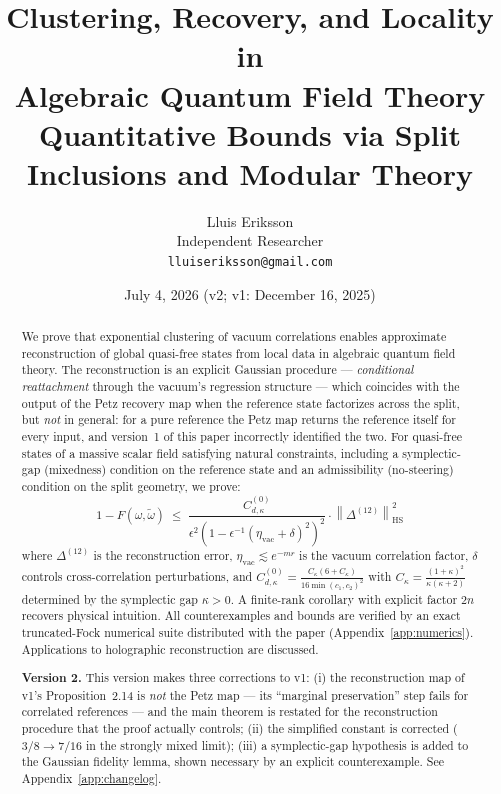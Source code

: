 \documentclass[11pt,a4paper]{article}
\title{Clustering, Recovery, and Locality in\\ Algebraic Quantum Field Theory\\[1ex]
\large Quantitative Bounds via Split Inclusions and Modular Theory}
\author{Lluis Eriksson\\ \small Independent Researcher\\ \small \texttt{lluiseriksson@gmail.com}}
\date{July 4, 2026 \quad (v2; v1: December 16, 2025)}
\theoremstyle{plain}
\theoremstyle{definition}
\theoremstyle{remark}
\newcommand{\hsnorm}[1]{\left\lVert #1 \right\rVert_{\mathrm{HS}}}
\newcommand{\etavac}{\eta_{\mathrm{vac}}}
\newcommand{\Ckappa}{C_{\kappa}}
\newcommand{\Cd}{C^{(0)}_{d,\kappa}}
\begin{document}
\maketitle

\begin{abstract}
We prove that exponential clustering of vacuum correlations enables approximate
reconstruction of global quasi-free states from local data in algebraic quantum
field theory. The reconstruction is an explicit Gaussian procedure ---
\emph{conditional reattachment} through the vacuum's regression structure ---
which coincides with the output of the Petz recovery map when the reference state
factorizes across the split, but \emph{not} in general: for a pure reference the
Petz map returns the reference itself for every input, and version~1 of this
paper incorrectly identified the two. For quasi-free states of a massive scalar
field satisfying natural constraints, including a symplectic-gap (mixedness)
condition on the reference state and an admissibility (no-steering) condition on
the split geometry, we prove:
\[
1 - F(\omega, \tilde{\omega}) \;\le\;
\frac{\Cd}{\epsilon^2 \left(1 - \epsilon^{-1}(\etavac + \delta)^2\right)^2}
\cdot \hsnorm{\Delta^{(12)}}^2
\]
where $\Delta^{(12)}$ is the reconstruction error, $\etavac \lesssim e^{-mr}$ is
the vacuum correlation factor, $\delta$ controls cross-correlation perturbations,
and $\Cd = \tfrac{\Ckappa(6+\Ckappa)}{16\min(c_1,c_2)^2}$ with
$\Ckappa = \tfrac{(1+\kappa)^2}{\kappa(\kappa+2)}$ determined by the symplectic gap
$\kappa > 0$. A finite-rank corollary with explicit factor $2n$ recovers physical
intuition. All counterexamples and bounds are verified by an exact truncated-Fock
numerical suite distributed with the paper (Appendix~\ref{app:numerics}).
Applications to holographic reconstruction are discussed.

\medskip
\noindent\textbf{Version 2.} This version makes three corrections to v1: (i) the
reconstruction map of v1's Proposition~2.14 is \emph{not} the Petz map --- its
``marginal preservation'' step fails for correlated references --- and the main
theorem is restated for the reconstruction procedure that the proof actually
controls; (ii) the simplified constant is corrected ($3/8 \to 7/16$ in the
strongly mixed limit); (iii) a symplectic-gap hypothesis is added to the Gaussian
fidelity lemma, shown necessary by an explicit counterexample. See
Appendix~\ref{app:changelog}.
\end{abstract}

\tableofcontents
\end{document}
